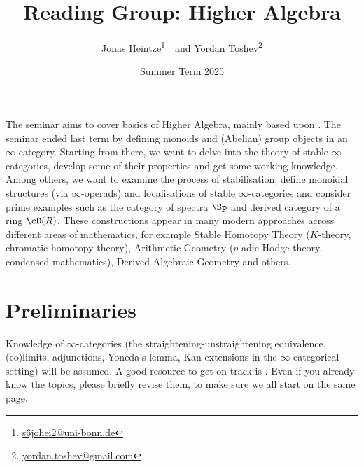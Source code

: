 \documentclass{article}
\title{\vspace{-50pt}Reading Group: Higher Algebra}
\author{Jonas Heintze\thanks{\href{mailto:s6johei2@uni-bonn.de}{
      \url{s6johei2@uni-bonn.de}}}~~and 
  Yordan Toshev\thanks{\href{mailto:yordan.toshev@uni-bonn.de}{
\url{yordan.toshev@gmail.com}}}}
\date{Summer Term 2025}
\begin{document}
\maketitle



\vspace{-5pt}
The seminar aims to cover basics of Higher Algebra, mainly based
upon \cite[Chapter II]{K-ThrNotes}.
The seminar ended last term by defining monoids and 
(Abelian) group objects in an $\infty$-category.
Starting from there, we want to delve into the
theory of stable $\infty$-categories, develop some
of their properties and get some working knowledge.
Among others, we want to examine the process of
stabilisation, define monoidal structures (via $\infty$-operads) 
and localisations 
of stable $\infty$-categories and consider prime examples such as
the category of spectra $\Sp$ and derived category of a 
ring $\cD(R)$.
These constructions appear in many modern approaches across different areas of 
mathematics,
for example
Stable Homotopy Theory ($K$-theory, chromatic homotopy theory),
Arithmetic Geometry ($p$-adic Hodge theory, condensed mathematics),
Derived Algebraic Geometry and others.


\section*{Preliminaries}
Knowledge of $\infty$-categories
(the straightening-unstraightening equivalence, (co)limits,
adjunctions, Yoneda's lemma, Kan extensions in the $\infty$-categorical
setting) will be assumed.
A good resource to get on track is \cite[Chapters 1-6]{infty-CatNotes}.
Even if you already know the topics, please briefly revise them,
to make sure we all start on the same page.
\end{document}
